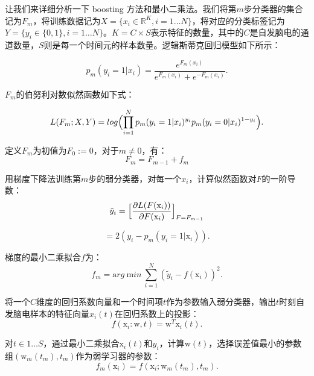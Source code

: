 \documentclass[a4paper]{ecust_thesis_translation}
\renewcommand\![1]{\immature{#1}}
\begin{document}
让我们来详细分析一下 boosting 方法和最小二乘法。我们将第$m$步分类器的集合记为$F_m$，将训练数据记为$X=\{ x_i\in \mathbb{R}^K, i=1\ldots N \}$，将对应的分类标签记为$Y=\{ y_i \in \{0,1 \}, i=1\ldots N \}$。$K=C\times S$表示特征的数量，其中的$C$是自发脑电的通道数量，$S$则是每一个时间元的样本数量。逻辑斯蒂克回归模型如下所示：

\begin{equation}
p_m(y_i=1|x_i)=\frac{e^{F_m(x_i)}}{e^{F_m(x_i)}+e^{-F_m(x_i)}}.
\end{equation}

$F_m$的伯努利对数似然函数如下式：

\begin{equation}
L(F_m; X, Y)=log\Bigl(\prod\limits^N_{i=1}{p_m(y_i=1|x_i)^{y_i}p_m(y_i=0|x_i)^{1-y_i}}\Bigr).
\end{equation}

定义$F_m$为初值为$F_0:=0$，对于$m\ne 0$，有：
\begin{equation}
  F_m=F_{m-1}+f_m
\end{equation}
  	
用梯度下降法训练第$m$步的弱分类器，对每一个$x_i$，计算似然函数对$F$的一阶导数：
\begin{equation}
  \tilde{y}_i = \Bigl[\frac{\partial{L(F(\mathrm x_i))}}{\partial F(\mathrm x_i)}\Bigr]_{F=F_{m-1}}
\end{equation}

\begin{equation}
  = 2(y_i-p_m(y_i=1|\mathrm x_i)).
\end{equation}

梯度的最小二乘拟合$f$为：
\begin{equation}
  f_m=\mathrm arg\ \mathrm min\ \sum^N_{i=1} (\tilde {y}_i-f(\mathrm x_i))^2.
\end{equation}

将一个$C$维度的回归系数向量和一个时间项$t$作为参数输入弱分类器，输出$t$时刻自发脑电样本的特征向量$x_i(t)$在回归系数上的投影：
\begin{equation}
  f(\mathrm{x}_i:\mathrm{w},t)=\mathrm{w}^T \mathrm{x}_i(t).
\end{equation}

对$t\in 1\ldots S$，通过最小二乘拟合$\mathrm{x}_i(t)$和$y_i$，计算$\mathrm{w}(t)$，选择误差值最小的参数组$(\mathrm{w}_m(t_m), t_m)$作为弱学习器的参数：
\begin{equation}
  f_m(\mathrm{x}_i)=f(\mathrm{x}_i;\mathrm{w}_m(t_m), t_m).
\end{equation}
\end{document}
